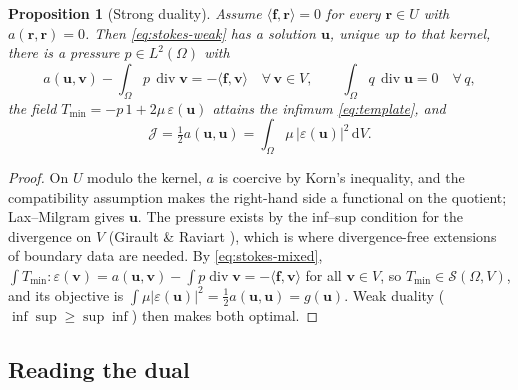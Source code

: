 \documentclass[11pt]{article}
\newtheorem{proposition}{Proposition}
\newcommand{\Jf}{\mathscr{J}}  %
\newcommand{\eps}{\varepsilon}
\newcommand{\bu}{\mathbf{u}}
\newcommand{\bv}{\mathbf{v}}
\newcommand{\bff}{\mathbf{f}}
\newcommand{\br}{\mathbf{r}}
\newcommand{\dV}{\,\mathrm{d}V}
\renewcommand{\div}{\operatorname{div}}
\newcommand{\ip}[2]{\langle #1, #2\rangle}
\begin{document}
\begin{proposition}[Strong duality]\label{prop:duality}
Assume $\ip{\bff}{\br} = 0$ for every $\br \in U$ with $a(\br,\br) = 0$.
Then \eqref{eq:stokes-weak} has a solution $\bu$, unique up to that
kernel, there is a pressure $p \in L^2(\Omega)$ with
\begin{equation}
  a(\bu,\bv) - \int_\Omega p\,\div\bv = -\ip{\bff}{\bv}
  \quad\forall\,\bv\in V, \qquad
  \int_\Omega q\,\div\bu = 0 \quad\forall\, q,
  \label{eq:stokes-mixed}
\end{equation}
the field $T_{\min} = -p\,1 + 2\mu\,\eps(\bu)$ attains the infimum
\eqref{eq:template}, and
\begin{equation}
  \Jf  = \tfrac12 a(\bu,\bu) = \int_\Omega \mu\,|\eps(\bu)|^2\dV .
  \label{eq:value}
\end{equation}
\end{proposition}
\begin{proof}
On $U$ modulo the kernel, $a$ is coercive by Korn's inequality, and the
compatibility assumption makes the right-hand side a functional on the
quotient; Lax--Milgram gives $\bu$. The pressure exists by the inf--sup
condition for the divergence on $V$ (Girault \& Raviart \cite{GR86}),
which is where divergence-free extensions of boundary data are needed.
By \eqref{eq:stokes-mixed}, $\int T_{\min}:\eps(\bv) = a(\bu,\bv) -
\int p\div\bv = -\ip{\bff}{\bv}$ for all $\bv\in V$, so
$T_{\min}\in\mathcal{S}(\Omega,V)$, and its objective is
$\int\mu|\eps(\bu)|^2 = \tfrac12a(\bu,\bu) = g(\bu)$. Weak duality
($\inf\sup \ge \sup\inf$) then makes both optimal.
\end{proof}

\subsection{Reading the dual}
\end{document}
